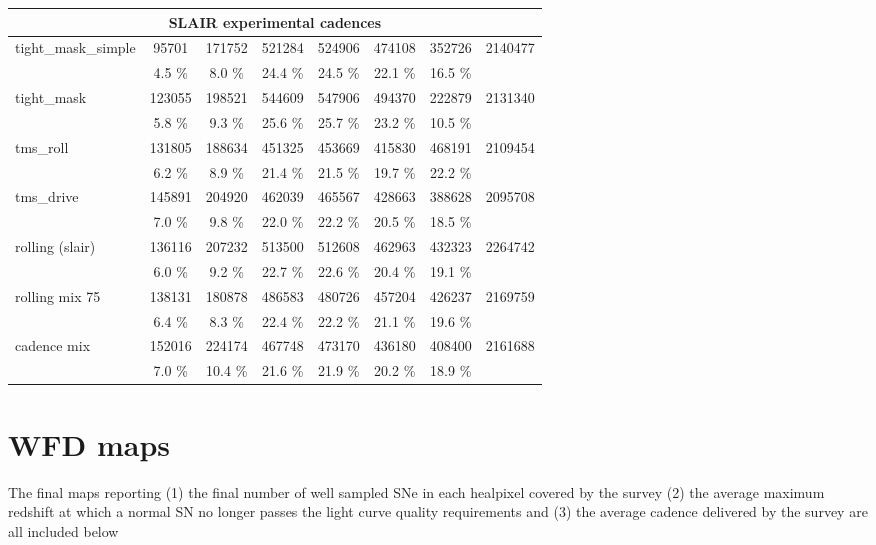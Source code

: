 \begin{appendices}
\begin{longtable}{l|ccccccc}
\hline
\hline       
\multicolumn{8}{c}{SLAIR experimental cadences}\\
\hline
   tight\_mask\_simple &   95701 &  171752 &  521284 &  524906 &  474108 &  352726 &  2140477 \\ 
                     &    4.5 \% &    8.0 \% &   24.4 \% &   24.5 \% &   22.1 \% &   16.5 \% & \\
\hline
          tight\_mask &  123055 &  198521 &  544609 &  547906 &  494370 &  222879 &  2131340 \\ 
                     &    5.8 \% &    9.3 \% &   25.6 \% &   25.7 \% &   23.2 \% &   10.5 \% & \\
\hline
            tms\_roll &  131805 &  188634 &  451325 &  453669 &  415830 &  468191 &  2109454 \\ 
                     &    6.2 \% &    8.9 \% &   21.4 \% &   21.5 \% &   19.7 \% &   22.2 \% & \\
\hline
           tms\_drive &  145891 &  204920 &  462039 &  465567 &  428663 &  388628 &  2095708 \\ 
                     &    7.0 \% &    9.8 \% &   22.0 \% &   22.2 \% &   20.5 \% &   18.5 \% & \\
\hline
     rolling (slair) &  136116 &  207232 &  513500 &  512608 &  462963 &  432323 &  2264742 \\ 
                     &    6.0 \% &    9.2 \% &   22.7 \% &   22.6 \% &   20.4 \% &   19.1 \% & \\
\hline
      rolling mix 75 &  138131 &  180878 &  486583 &  480726 &  457204 &  426237 &  2169759 \\ 
                     &    6.4 \% &    8.3 \% &   22.4 \% &   22.2 \% &   21.1 \% &   19.6 \% & \\
\hline
         cadence mix &  152016 &  224174 &  467748 &  473170 &  436180 &  408400 &  2161688 \\ 
                     &    7.0 \% &   10.4 \% &   21.6 \% &   21.9 \% &   20.2 \% &   18.9 \% & \\
\hline

      
    \end{longtable}
  
  \section{WFD maps}
  \label{sec:wfd_maps}
  The final maps reporting (1) the final number of well sampled SNe in
  each healpixel covered by the survey (2) the average maximum
  redshift at which a normal SN no longer passes the light curve
  quality requirements and (3) the average cadence delivered by the
  survey are all included below 
  

\end{appendices}

